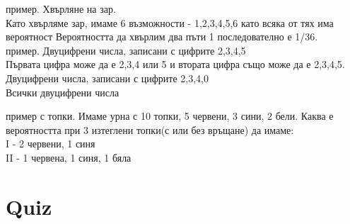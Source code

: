 \documentclass{article}
\theoremstyle{plain}
\begin{document}
	пример. Хвърляне на зар.\\
	Като хвърляме зар, имаме 6 възможности - 1,2,3,4,5,6 като всяка от тях има вероятност  %
	Вероятността да хвърлим два пъти 1 последователно е 1/36.\\
	пример. Двуцифрени числа, записани с цифрите 2,3,4,5\\
	
	Първата цифра може да е 2,3,4 или 5 и втората цифра също може да е 2,3,4,5.
	\\
	
 Двуцифрени числа, записани с цифрите 2,3,4,0\\
 Всички двуцифрени числа

пример с топки. Имаме урна с 10 топки, 5 червени, 3 сини, 2 бели. Каква е вероятността при 3 изтеглени топки(с или без връщане) да имаме:\\
I - 2 червени, 1 синя\\
II -  1 червена, 1 синя, 1 бяла



\section{Quiz}
\end{document}
